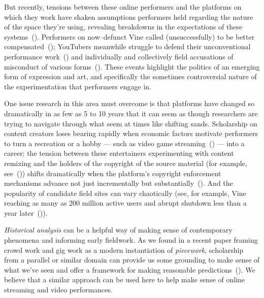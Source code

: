 \documentclass[10pt]{article}
\begin{document}
But recently, tensions between these online performers and the platforms on which they work have shaken
assumptions performers held regarding the nature of the space they're using,
revealing breakdowns in the expectations of these systems~(\cite{doi:10.1177/1461444809342738}).
Performers on now--defunct Vine called (unsuccessfully) to be better compensated~(\cite{vineWantsMoney,vineInsiderMeeting});
YouTubers meanwhile struggle to defend their unconventional performance work~(\cite{h3h3Lawsuit})
and individually and collectively field accusations of misconduct of various forms~(\cite{youtubeDramaResponses}).
These events highlight the politics of an emerging form of expression and art,
and specifically the sometimes controversial nature of the experimentation that performers engage in.

One issue research in this area must overcome is that
platforms have changed so dramatically in as few as 5 to 10 years that
it can seem as though researchers are trying to navigate through what seem at times like shifting sands.
Scholarship on content creators loses bearing rapidly when
economic factors motivate performers to turn a recreation or a hobby
--- such as video game streaming~(\cite{Hamilton:2014:STF:2611105.2557048}) --- into a career;
the tension between these entertainers experimenting with content remixing and
the holders of the copyright of the source material
(for example, see~(\cite{Hilderbrand48}))
shifts dramatically when
the platform's copyright enforcement mechanisms advance
not just incrementally but substantially~(\cite{kim2012institutionalization}).
And the popularity of candidate field sites can vary chaotically
(see, for example, Vine reaching as many as 200 million active users and
abrupt shutdown less than a year later~(\cite{vineDecline})).

\textit{Historical analysis}
can be a helpful way of
making sense of contemporary phenomena and informing early fieldwork.
As we found in a recent paper framing crowd work and gig work as a modern instantiation of \textit{piecework},
scholarship from a parallel or similar domain can
provide us some grounding to make sense of what we've seen and offer a framework for making reasonable predictions~(\cite{pieceworkCrowdworkGigwork}).
We believe that a similar approach can be used here to help make sense of online streaming and video performances.
\end{document}
